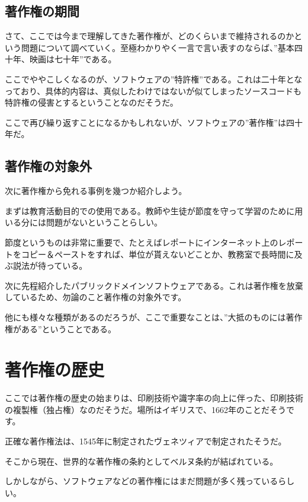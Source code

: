 \documentclass[a4j]{jsarticle}
\begin{document}
\subsection*{著作権の期間}
さて、ここでは今まで理解してきた著作権が、どのくらいまで維持されるのかという問題について調べていく。至極わかりやく一言で言い表すのならば、”基本四十年、映画は七十年”である。\cite{def_time} \par
ここでややこしくなるのが、ソフトウェアの”特許権”である。これは二十年となっており、具体的内容は、真似したわけではないが似てしまったソースコードも特許権の侵害とするということなのだそうだ。 \cite{def_tokkyo} \par
ここで再び繰り返すことになるかもしれないが、ソフトウェアの”著作権”は四十年だ。
\subsection*{著作権の対象外}
次に著作権から免れる事例を幾つか紹介しよう。 \par
まずは教育活動目的での使用である。教師や生徒が節度を守って学習のために用いる分には問題がないということらしい。\par
節度というものは非常に重要で、たとえばレポートにインターネット上のレポートをコピー＆ペーストをすれば、単位が貰えないどことか、教務室で長時間に及ぶ説法が待っている。\par
次に先程紹介したパブリックドメインソフトウェアである。これは著作権を放棄しているため、勿論のこと著作権の対象外です。\par
他にも様々な種類があるのだろうが、ここで重要なことは、”大抵のものには著作権がある”ということである。
\section*{著作権の歴史}
ここでは著作権の歴史の始まりは、印刷技術や識字率の向上に伴った、印刷技術の複製権（独占権）なのだそうだ。場所はイギリスで、1662年のことだそうです。\par
正確な著作権法は、1545年に制定されたヴェネツィアで制定されたそうだ。 \par
そこから現在、世界的な著作権の条約としてベルヌ条約が結ばれている。\par
しかしながら、ソフトウェアなどの著作権にはまだ問題が多く残っているらしい。\cite{def_his} 
\end{document}
